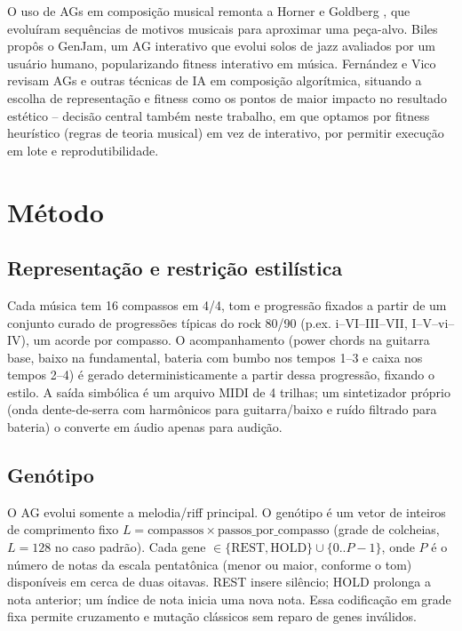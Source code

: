 \documentclass{article}
\begin{document}
O uso de AGs em composição musical remonta a
Horner e Goldberg \cite{HornerGoldberg1991}, que evoluíram sequências de
motivos musicais para aproximar uma peça-alvo. Biles \cite{Biles1994GenJam}
propôs o GenJam, um AG interativo que evolui solos de jazz avaliados por um
usuário humano, popularizando fitness interativo em música. Fernández e
Vico \cite{FernandezVico2013} revisam AGs e outras técnicas de IA em
composição algorítmica, situando a escolha de representação e fitness como
os pontos de maior impacto no resultado estético -- decisão central também
neste trabalho, em que optamos por fitness heurístico (regras de teoria
musical) em vez de interativo, por permitir execução em lote e
reprodutibilidade.

\section{Método}\label{sec:method}

\subsection{Representação e restrição estilística}
Cada música tem 16 compassos em 4/4, tom e progressão fixados a partir de
um conjunto curado de progressões típicas do rock 80/90 (p.ex.
i--VI--III--VII, I--V--vi--IV), um acorde por compasso. O acompanhamento
(power chords na guitarra base, baixo na fundamental, bateria com bumbo nos
tempos 1--3 e caixa nos tempos 2--4) é gerado deterministicamente a partir
dessa progressão, fixando o estilo. A saída simbólica é um arquivo MIDI de
4 trilhas; um sintetizador próprio (onda dente-de-serra com harmônicos para
guitarra/baixo e ruído filtrado para bateria) o converte em áudio apenas
para audição.

\subsection{Genótipo}
O AG evolui somente a melodia/riff principal. O genótipo é um vetor de
inteiros de comprimento fixo $L = \text{compassos} \times
\text{passos\_por\_compasso}$ (grade de colcheias, $L=128$ no caso
padrão). Cada gene $\in \{\text{REST}, \text{HOLD}\} \cup \{0..P-1\}$, onde
$P$ é o número de notas da escala pentatônica (menor ou maior, conforme o
tom) disponíveis em cerca de duas oitavas. REST insere silêncio; HOLD
prolonga a nota anterior; um índice de nota inicia uma nova nota. Essa
codificação em grade fixa permite cruzamento e mutação clássicos sem
reparo de genes inválidos.
\end{document}
